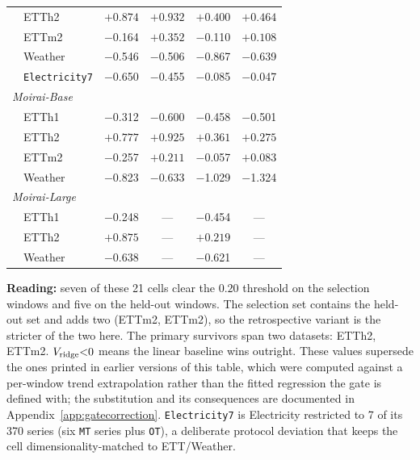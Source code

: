 \begin{table}[t]
\begin{tabular}{ll cc cc}
 & ETTh2                  & $\mathbf{+0.874}$ & $\mathbf{+0.932}$ & $\mathbf{+0.400}$ & $\mathbf{+0.464}$ \\
 & ETTm2                  & $-$0.164 & $\mathbf{+0.352}$ & $-$0.110 & $\mathbf{+0.108}$ \\
 & Weather                & $-$0.546 & $-$0.506 & $-$0.867 & $-$0.639 \\
 & \texttt{Electricity7}  & $-$0.650 & $-$0.455 & $-$0.085 & $-$0.047 \\
\midrule
\multicolumn{6}{l}{\textit{Moirai-Base}} \\
 & ETTh1                  & $-$0.312 & $-$0.600 & $-$0.458 & $-$0.501 \\
 & ETTh2                  & $\mathbf{+0.777}$ & $\mathbf{+0.925}$ & $\mathbf{+0.361}$ & $\mathbf{+0.275}$ \\
 & ETTm2                  & $-$0.257 & $\mathbf{+0.211}$ & $-$0.057 & $\mathbf{+0.083}$ \\
 & Weather                & $-$0.823 & $-$0.633 & $-$1.029 & $-$1.324 \\
\midrule
\multicolumn{6}{l}{\textit{Moirai-Large}} \\
 & ETTh1                  & $-$0.248 & --- & $-$0.454 & --- \\
 & ETTh2                  & $\mathbf{+0.875}$ & --- & $\mathbf{+0.219}$ & --- \\
 & Weather                & $-$0.638 & --- & $-$0.621 & --- \\
\bottomrule
\end{tabular}
\vspace{1pt}

{\footnotesize
\textbf{Reading:} seven of these 21 cells clear the $0.20$ threshold on the selection windows and five on the held-out windows.
The selection set contains the held-out set and adds two (ETTm2, ETTm2), so the retrospective variant is the stricter of the two here.
The primary survivors span two datasets: ETTh2, ETTm2.
$V_{\text{ridge}}{<}0$ means the linear baseline wins outright.
These values supersede the ones printed in earlier versions of this table,
which were computed against a per-window trend extrapolation rather than the
fitted regression the gate is defined with; the substitution and its
consequences are documented in Appendix~\ref{app:gatecorrection}.
\texttt{Electricity7} is Electricity restricted to 7 of its 370 series (six
\texttt{MT} series plus \texttt{OT}), a deliberate protocol deviation that
keeps the cell dimensionality-matched to ETT/Weather.}
\end{table}
